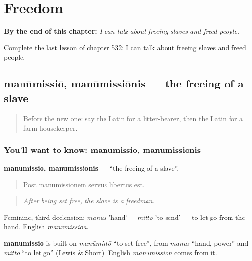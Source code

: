 
\chapter{Freedom}
\label{ch:la-freedom}

\begin{chapteropening}
\textbf{By the end of this chapter:} \emph{I can talk about freeing slaves and freed people.}

Complete the last lesson of chapter 532: I can talk about freeing slaves and freed people.
\end{chapteropening}

\section[manūmissiō, manūmissiōnis]{manūmissiō, manūmissiōnis — the freeing of a slave}

\label{lesson:LA-C532-manumissio}



\begin{quote}
Before the new one: say the Latin for a litter-bearer, then the Latin for a farm housekeeper.
\end{quote}

\subsection*{You'll want to know: manūmissiō, manūmissiōnis}
\textbf{manūmissiō, manūmissiōnis} — \textquotedblleft{}the freeing of a slave\textquotedblright{}.

\begin{quote}
Post manūmissiōnem servus lībertus est.
\end{quote}

\begin{quote}
\emph{After being set free, the slave is a freedman.}
\end{quote}

Feminine, third declension: \emph{manus} 'hand' + \emph{mittō} 'to send' — to let go from the hand. English \emph{manumission}.

\begin{cousinweb}
\textbf{manūmissiō} is built on \emph{manūmittō} \textquotedblleft{}to set free\textquotedblright{}, from \emph{manus} \textquotedblleft{}hand, power\textquotedblright{} and \emph{mittō} \textquotedblleft{}to let go\textquotedblright{} (Lewis \& Short). English \emph{manumission} comes from it.
\end{cousinweb}

